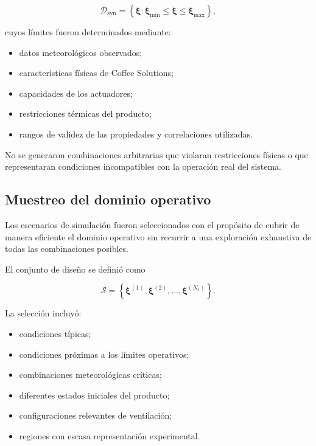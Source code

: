 \begin{equation}
\mathcal{D}_{\mathrm{syn}}
=
\left\{
\boldsymbol{\xi}:
\boldsymbol{\xi}_{\min}
\leq
\boldsymbol{\xi}
\leq
\boldsymbol{\xi}_{\max}
\right\},
\label{eq:dominio_sintetico}
\end{equation}

cuyos límites fueron determinados mediante:

\begin{itemize}
    \item datos meteorológicos observados;
    \item características físicas de Coffee Solutions;
    \item capacidades de los actuadores;
    \item restricciones térmicas del producto;
    \item rangos de validez de las propiedades y correlaciones utilizadas.
\end{itemize}

No se generaron combinaciones arbitrarias que violaran restricciones físicas o que representaran condiciones incompatibles con la operación real del sistema.

\subsection{Muestreo del dominio operativo}
\label{subsec:muestreo_dominio_hibrido}

Los escenarios de simulación fueron seleccionados con el propósito de cubrir de manera eficiente el dominio operativo sin recurrir a una exploración exhaustiva de todas las combinaciones posibles.

El conjunto de diseño se definió como

\begin{equation}
\mathcal{S}
=
\left\{
\boldsymbol{\xi}^{(1)},
\boldsymbol{\xi}^{(2)},
\ldots,
\boldsymbol{\xi}^{(N_s)}
\right\}.
\end{equation}

La selección incluyó:

\begin{itemize}
    \item condiciones típicas;
    \item condiciones próximas a los límites operativos;
    \item combinaciones meteorológicas críticas;
    \item diferentes estados iniciales del producto;
    \item configuraciones relevantes de ventilación;
    \item regiones con escasa representación experimental.
\end{itemize}

